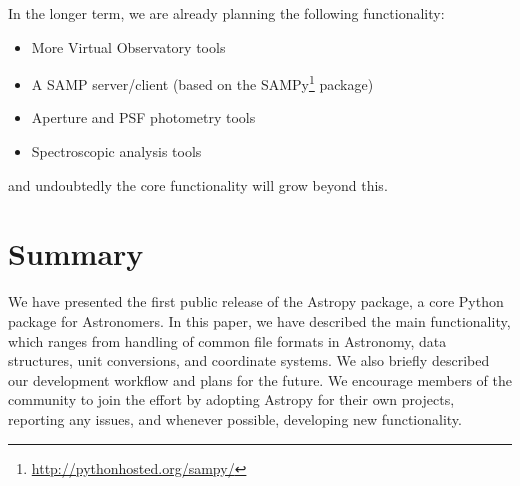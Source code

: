 \documentclass[traditabstract]{aa}
\begin{document}
In the longer term, we are already planning the following functionality:

\begin{itemize}
\item More Virtual Observatory tools
\item A SAMP server/client (based on the SAMPy\footnote{\url{http://pythonhosted.org/sampy/}} package)
\item Aperture and PSF photometry tools
\item Spectroscopic analysis tools
\end{itemize}

\noindent and undoubtedly the core functionality will grow beyond this.

\section{Summary}

\label{sec:summary}


We have presented the first public release of the Astropy package, a core
Python package for Astronomers. In this paper, we have described the main
functionality, which ranges from handling of common file formats in Astronomy,
data structures, unit conversions, and coordinate systems. We also briefly
described our development workflow and plans for the future. We encourage
members of the community to join the effort by adopting Astropy for their own
projects, reporting any issues, and whenever possible, developing new
functionality.



\end{document}
